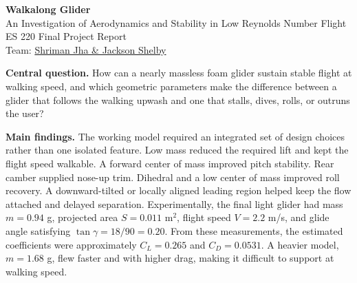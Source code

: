 \documentclass[10pt]{article}
\begin{document}
\begin{center}
{\LARGE \textbf{Walkalong Glider}}\\[3pt]
{\large An Investigation of Aerodynamics and Stability in Low Reynolds Number Flight}\\[8pt]
{\normalsize ES 220 Final Project Report}\\[4pt]
{\normalsize Team: \underline{Shriman Jha \& Jackson Shelby} \hspace{0.5in}}
\end{center}

\vspace{2pt}
\begin{abstract}
A walkalong glider is a very light, unpowered airfoil that can remain aloft in a user-generated flow field at approximately walking speed. Unlike a conventional thrown glider, its useful operating state is not free flight through still air; it is flight in a moving flow produced when a person walks behind a board, hand, or other lifting surface. This project studied how such a simple foam aircraft can maintain lift and stability at low speed, where the Reynolds number is low enough that viscous effects, separation, and small geometric changes strongly influence performance. We combined hand analysis, physical prototyping, video-based measurements, and COMSOL simulations to connect observed flight behavior to lift, drag, pitching moment, roll stability, and flow attachment.
\end{abstract}

\textbf{Central question.} How can a nearly massless foam glider sustain stable flight at walking speed, and which geometric parameters make the difference between a glider that follows the walking upwash and one that stalls, dives, rolls, or outruns the user?

\textbf{Main findings.} The working model required an integrated set of design choices rather than one isolated feature. Low mass reduced the required lift and kept the flight speed walkable. A forward center of mass improved pitch stability. Rear camber supplied nose-up trim. Dihedral and a low center of mass improved roll recovery. A downward-tilted or locally aligned leading region helped keep the flow attached and delayed separation. Experimentally, the final light glider had mass $m=0.94$ g, projected area $S=0.011$ m$^2$, flight speed $V=2.2$ m/s, and glide angle satisfying $\tan\gamma=18/90=0.20$. From these measurements, the estimated coefficients were approximately $C_L=0.265$ and $C_D=0.0531$. A heavier model, $m=1.68$ g, flew faster and with higher drag, making it difficult to support at walking speed.
\end{document}
